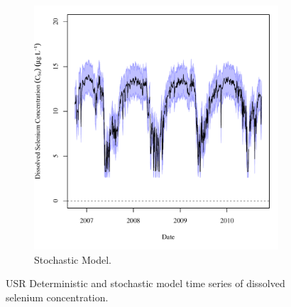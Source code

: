 \begin{landscape}
\begin{figure}
\begin{subfigure}{0.7\textwidth}
			\includegraphics[width=\tableCustomSize]{"Figures/Results_USR/Stochastic/c TS U201"}
			\caption{Stochastic Model.}
		\end{subfigure}
		\caption{USR Deterministic and stochastic model time series of dissolved selenium concentration.}
	\end{figure}
\end{landscape}

